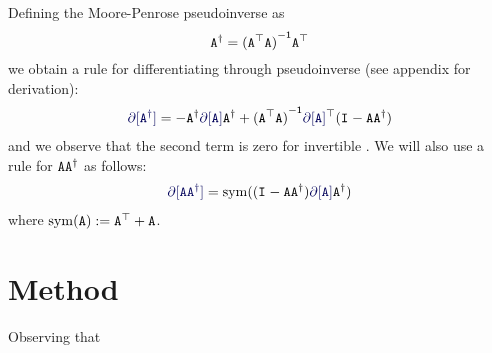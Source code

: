 \documentclass[runningheads]{llncs}
\def\eqlabel#1{\label{eq:#1}}
\def\tr{^\top}
\begin{document}
Defining the Moore-Penrose pseudoinverse as
\begin{equation}
\pinv \mA = \inv{(\mA\tr \mA)}\mA\tr
\end{equation}
we obtain a rule for differentiating through pseudoinverse (see appendix for derivation):
\begin{align}
\diff[\pinv \mA] = -\pinv \mA \diff[\mA] \pinv \mA +
\inv{(\mA\tr\mA)}\diff[\mA]\tr(\Id{}-\mA\pinv\mA)
\eqlabel{diffpinv}
\end{align}
and we observe that the second term is zero for invertible \mA.  We will also use a rule for $\mathtt{A} {{\mathtt{A}}^\dagger}$ as follows:
\begin{align}
\diff[\mA \pinv \mA] = \sym((\Id{} - \mA\pinv \mA) \diff[\mA] \pinv \mA)
\end{align}
where $\sym(\mA) := \mA\tr + \mA$. 


\section{Method}
Observing that 

\vecdot

\end{document}
